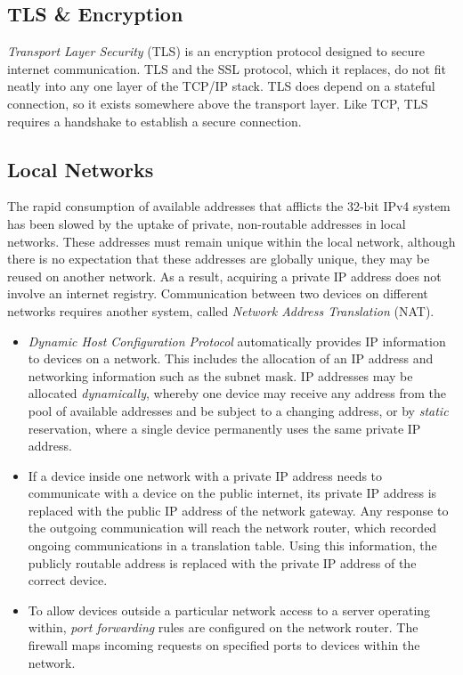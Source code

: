 \documentclass[10pt]{article}
\begin{document}
\subsection{TLS \& Encryption}
\label{sec:orgb8c495d}

\emph{Transport Layer Security} (TLS) is an encryption protocol designed to secure internet communication. TLS and the SSL protocol, which it replaces, do not fit neatly into any one layer of the TCP/IP stack. TLS does depend on a stateful connection, so it exists somewhere above the transport layer. Like TCP, TLS requires a handshake to establish a secure connection.

\subsection{Local Networks}
\label{sec:org2b39435}

The rapid consumption of available addresses that afflicts the 32-bit IPv4 system has been slowed by the uptake of private, non-routable addresses in local networks. These addresses must remain unique within the local network, although there is no expectation that these addresses are globally unique, they may be reused on another network. As a result, acquiring a private IP address does not involve an internet registry. Communication between two devices on different networks requires another system, called \emph{Network Address Translation} (NAT).

\begin{itemize}
\item \emph{Dynamic Host Configuration Protocol} automatically provides IP information to devices on a network. This includes the allocation of an IP address and networking information such as the subnet mask. IP addresses may be allocated \emph{dynamically}, whereby one device may receive any address from the pool of available addresses and be subject to a changing address, or by \emph{static} reservation, where a single device permanently uses the same private IP address.

\item If a device inside one network with a private IP address needs to communicate with a device on the public internet, its private IP address is replaced with the public IP address of the network gateway. Any response to the outgoing communication will reach the network router, which recorded ongoing communications in a translation table. Using this information, the publicly routable address is replaced with the private IP address of the correct device.

\item To allow devices outside a particular network access to a server operating within, \emph{port forwarding} rules are configured on the network router. The firewall maps incoming requests on specified ports to devices within the network.
\end{itemize}
\end{document}
